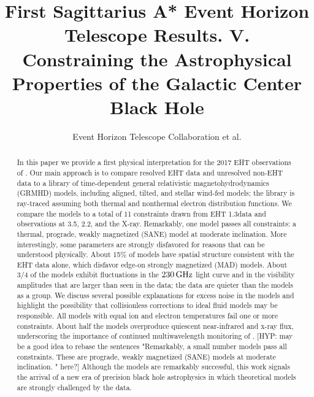 \documentclass[twocolumn,twocolappendix,tighten,dvipsnames,linenumbers]{aastex63}
\newcommand\hyp[1]{{\color{Salmon}[HYP: #1]}}
\begin{document}
\title{First Sagittarius A* Event Horizon Telescope Results. V.\\
  Constraining the Astrophysical Properties of the Galactic Center Black Hole}

%
\author{Event Horizon Telescope Collaboration et al.}


\received{\today}
\revised{\today}

\begin{abstract}

In this paper we provide a first physical interpretation for the 2017
EHT observations of \sgra.
Our main approach is to compare resolved EHT data and unresolved
non-EHT data to a library of time-dependent general relativistic
magnetohydrodynamics (GRMHD) models, including aligned, tilted, and
stellar wind-fed models; the library is ray-traced assuming both
thermal and nonthermal electron distribution functions.  We compare
the models to a total of 11 constraints drawn from EHT 1.3\mm data and  observations at 3.5\mm, 2.2\um, and the X-ray.  Remarkably, one model passes all constraints: a thermal, prograde, weakly magnetized (SANE) model at moderate inclination.  More interestingly, some parameters are strongly disfavored for reasons that can be understood physically.
About 15\% of models have spatial structure consistent with the EHT data alone, which disfavor edge-on strongly magnetized (MAD) models.
About 3/4 of the models exhibit fluctuations in the $230\,\mathrm{GHz}$
light curve and in the visibility amplitudes that are larger than seen in the data; the data are quieter than the models as a group.
We discuss several possible explanations for excess noise
in the models and highlight the possibility that collisionless
corrections to ideal fluid models may be responsible.
All models with equal ion and electron temperatures fail one or more
constraints.
About half the models overproduce quiescent near-infrared and x-ray
flux, underscoring the importance of continued multiwavelength
monitoring of \sgra.
\hyp{may be a good idea to rebase the sentences "Remarkably, a small number models pass all constraints.  These are prograde, weakly magnetized (SANE) models at moderate inclination.  " here?}
Although the models are remarkably successful, this work
signals the arrival of a new era of precision black hole astrophysics
in which theoretical models are strongly challenged by the data.
\end{abstract}
\end{document}
